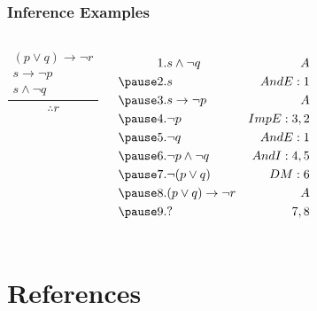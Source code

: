 \documentclass[dvipsnames]{beamer}
\begin{document}
\begin{frame}
  \frametitle{Inference Examples}

  \begin{columns}
    \[
    \frac
      {
        \begin{array}{c}
          (p \vee q) \rightarrow \neg r\\
          s \rightarrow \neg p\\
          s \wedge \neg q
        \end{array}
      }
      {
        \therefore r
      }
    \]

    \pause
    \begin{eqnarray*}
      1. & s \wedge \neg q                & A\\
      \pause
      2. & s                              & AndE:1\\
      \pause
      3. & s \rightarrow \neg p           & A\\
      \pause
      4. & \neg p                         & ImpE:3,2\\
      \pause
      5. & \neg q                         & AndE:1\\
      \pause
      6. & \neg p \wedge \neg q           & AndI:4,5\\
      \pause
      7. & \neg (p \vee q)                & DM:6\\
      \pause
      8. & (p \vee q) \rightarrow \neg r  & A\\
      \pause
      9. & ?                              & 7,8
    \end{eqnarray*}
  \end{columns}
\end{frame}

\section*{References}
\end{document}
